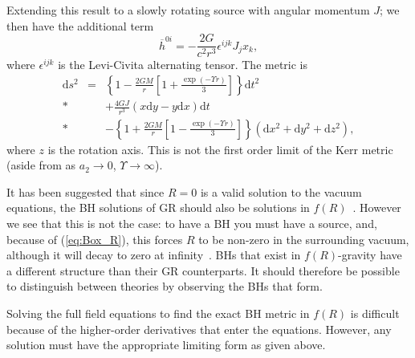 \documentclass[aps,prd,amsfonts,amssymb,amsmath,nofootinbib,reprint,showpacs]{revtex4-1}
\newcommand{\eqnref}[1]{(\ref{eq:#1})}
\newcommand{\dd}{\ensuremath{\text{d}}}
\begin{document}
Extending this result to a slowly rotating source with angular momentum $J$; we then have the additional term~\cite{Hobson2006}
\begin{equation}
\overline{h}^{0i} = -\frac{2G}{c^2r^3} \epsilon^{ijk}J_j x_k,
\end{equation}
where $\epsilon^{ijk}$ is the Levi-Civita alternating tensor. The metric is
\begin{eqnarray}
\dd s^2 & = & \left\{1-\frac{2GM}{r}\left[1 + \frac{\exp(- \Upsilon r)}{3}\right]\right\}\dd t^2 \nonumber \\*
& & + {} \frac{4GJ}{r^3}\left(x\dd y - y\dd x\right)\dd t \nonumber \\*
& & - {} \left\{1 +\frac{2GM}{r}\left[1 - \frac{\exp(- \Upsilon r)}{3}\right]\right\}\left(\dd x^2 + \dd y^2 + \dd z^2\right),\label{eq:f(R)_Kerr}
\end{eqnarray}
where $z$ is the rotation axis. This is not the first order limit of the Kerr metric (aside from as $a_2 \rightarrow 0$, $\Upsilon \rightarrow \infty$).

It has been suggested that since $R = 0$ is a valid solution to the vacuum equations, the BH solutions of GR should also be solutions in $f(R)$~\cite{Psaltis2008, Barausse2008}. However we see that this is not the case: to have a BH you must have a source, and, because of \eqnref{Box_R}, this forces $R$ to be non-zero in the surrounding vacuum, although it will decay to zero at infinity~\cite{Olmo2007c}. BHs that exist in $f(R)$-gravity have a different structure than their GR counterparts. It should therefore be possible to distinguish between theories by observing the BHs that form.

Solving the full field equations to find the exact BH metric in $f(R)$ is difficult because of the higher-order derivatives that enter the equations. However, any solution must have the appropriate limiting form as given above.
\end{document}
